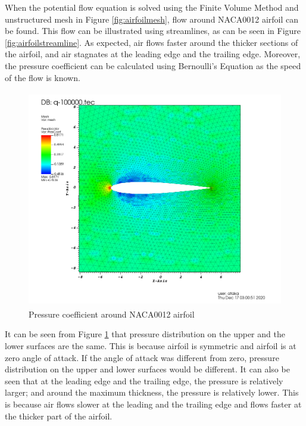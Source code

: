 \documentclass[letterpaper,12pt]{article}
\begin{document}
\vspace{1cm}

When the potential flow equation is solved using the Finite Volume Method and unstructured mesh in Figure \ref{fig:airfoilmesh},
flow around NACA0012 airfoil can be found. This flow can be illustrated using streamlines, as can be seen in 
Figure \ref{fig:airfoilstreamline}. As expected, air flows faster around the thicker sections of the airfoil, 
and air stagnates at the leading edge and the trailing edge. Moreover, the pressure coefficient can be calculated using Bernoulli's Equation
as the speed of the flow is known.

\newpage

\begin{figure} [!h]
	\centering
	\includegraphics[height = 9.5cm]{graph/medium/medium_pressure0000.png}
	\caption{Pressure coefficient around NACA0012 airfoil}
    \label{fig:airfoilpressure}
\end{figure}

\vspace{1cm}

It can be seen from Figure \ref{fig:airfoilpressure} that pressure distribution on the upper and the lower surfaces are the same.
This is because airfoil is symmetric and airfoil is at zero angle of attack. If the angle of attack was different from zero, 
pressure distribution on the upper and lower surfaces would be different. It can also be seen that at the leading edge and the trailing edge,
the pressure is relatively larger; and around the maximum thickness, the pressure is relatively lower. This is because air flows slower at the
leading and the trailing edge and flows faster at the thicker part of the airfoil.
\newpage
\end{document}
